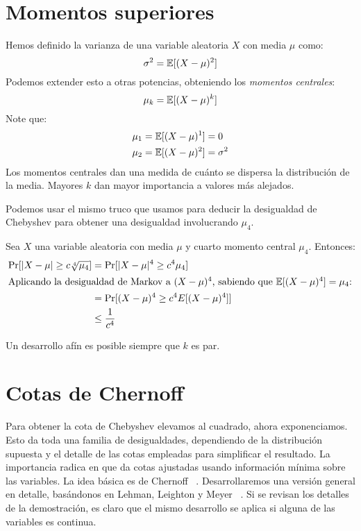 \section{Momentos superiores}
\label{sec:momentos-superiores}

  Hemos definido la varianza de una variable aleatoria \(X\) con media \(\mu\)
  como:
  \begin{equation*}
    \sigma^2
      = \operatorname{\mathbb{E}}[ (X - \mu)^2 ]
  \end{equation*}
  Podemos extender esto a otras potencias,
  obteniendo los \emph{momentos centrales}:
  \begin{equation*}
    \mu_k
      = \operatorname{\mathbb{E}}[ (X - \mu)^k ]
  \end{equation*}
  Note que:
  \begin{align*}
    \mu_1
      &= \operatorname{\mathbb{E}}[ (X - \mu)^1 ]
        = 0 \\
    \mu_2
      &= \operatorname{\mathbb{E}}[ (X - \mu)^2 ]
        = \sigma^2
  \end{align*}
  Los momentos centrales
  dan una medida de cuánto se dispersa la distribución de la media.
  Mayores \(k\) dan mayor importancia a valores más alejados.

  Podemos usar el mismo truco
  que usamos para deducir la desigualdad de Chebyshev
  para obtener una desigualdad involucrando \(\mu_4\).

  Sea \(X\) una variable aleatoria con media \(\mu\)
  y cuarto momento central \(\mu_4\).
  Entonces:
  \begin{align*}
    \Pr[ \lvert X - \mu \rvert \ge c \sqrt[4]{\mu_4} ]
      &=   \Pr[ \lvert X - \mu \rvert^4 \ge c^4 \mu_4 ] \\
    \intertext{Aplicando la desigualdad de Markov a \((X - \mu)^4\),
              sabiendo que \(\operatorname{\mathbb{E}}[ (X - \mu)^4 ] = \mu_4\):}
      &=   \Pr[(X - \mu)^4 \ge c^4 E[(X - \mu)^4]] \\
      &\le \frac{1}{c^4}
  \end{align*}

  Un desarrollo afín es posible siempre que \(k\) es par.

\section{Cotas de Chernoff}
\label{sec:Chernoff}

  Para obtener la cota de Chebyshev elevamos al cuadrado,
  ahora exponenciamos.
  Esto da toda una familia de desigualdades,
  dependiendo de la distribución supuesta
  y el detalle de las cotas empleadas para simplificar el resultado.
  La importancia radica en que da cotas ajustadas
  usando información mínima sobre las variables.
  La idea básica es de Chernoff~%
   \cite{chernoff52:_bound}.
  Desarrollaremos una versión general en detalle,
  basándonos en Lehman, Leighton y Meyer~%
    \cite[sección~20.6.2]{lehman18:_mathem_comput_scien}.
  Si se revisan los detalles de la demostración,
  es claro que el mismo desarrollo se aplica
  si alguna de las variables es continua.

